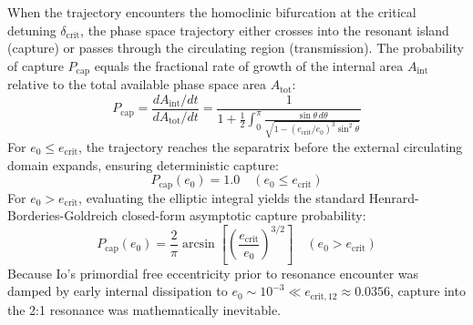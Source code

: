 \documentclass[11pt,a4paper]{article}
\begin{document}
When the trajectory encounters the homoclinic bifurcation at the critical detuning $\delta_{\mathrm{crit}}$, the phase space trajectory either crosses into the resonant island (capture) or passes through the circulating region (transmission). The probability of capture $P_{\mathrm{cap}}$ equals the fractional rate of growth of the internal area $A_{\mathrm{int}}$ relative to the total available phase space area $A_{\mathrm{tot}}$:
\begin{equation}
P_{\mathrm{cap}} = \frac{d A_{\mathrm{int}} / dt}{d A_{\mathrm{tot}} / dt} = \frac{1}{1 + \frac{1}{2} \int_0^{\pi} \frac{\sin\theta \, d\theta}{\sqrt{1 - (e_{\mathrm{crit}}/e_0)^3 \sin^2\theta}}}
\end{equation}
For $e_0 \le e_{\mathrm{crit}}$, the trajectory reaches the separatrix before the external circulating domain expands, ensuring deterministic capture:
\begin{equation}
P_{\mathrm{cap}}(e_0) = 1.0 \quad (e_0 \le e_{\mathrm{crit}})
\end{equation}
For $e_0 > e_{\mathrm{crit}}$, evaluating the elliptic integral yields the standard Henrard-Borderies-Goldreich closed-form asymptotic capture probability:
\begin{equation}
P_{\mathrm{cap}}(e_0) = \frac{2}{\pi} \arcsin\left[ \left( \frac{e_{\mathrm{crit}}}{e_0} \right)^{3/2} \right] \quad (e_0 > e_{\mathrm{crit}})
\end{equation}
Because Io's primordial free eccentricity prior to resonance encounter was damped by early internal dissipation to $e_0 \sim 10^{-3} \ll e_{\mathrm{crit},12} \approx 0.0356$, capture into the 2:1 resonance was mathematically inevitable.
\end{document}
